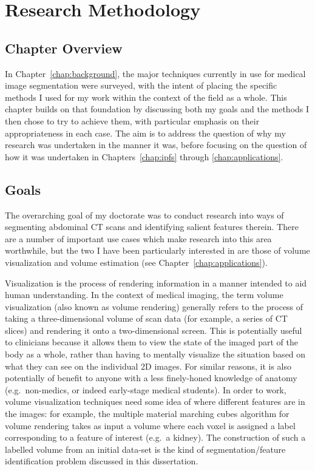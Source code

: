 \chapter{Research Methodology}
\label{chap:methodology}

\section{Chapter Overview}

In Chapter~\ref{chap:background}, the major techniques currently in use for medical image segmentation were surveyed, with the intent of placing the specific methods I used for my work within the context of the field as a whole. This chapter builds on that foundation by discussing both my goals and the methods I then chose to try to achieve them, with particular emphasis on their appropriateness in each case. The aim is to address the question of why my research was undertaken in the manner it was, before focusing on the question of how it was undertaken in Chapters~\ref{chap:ipfs} through \ref{chap:applications}.

\section{Goals}

The overarching goal of my doctorate was to conduct research into ways of segmenting abdominal CT scans and identifying salient features therein. There are a number of important use cases which make research into this area worthwhile, but the two I have been particularly interested in are those of volume visualization and volume estimation (see Chapter~\ref{chap:applications}).

Visualization is the process of rendering information in a manner intended to aid human understanding. In the context of medical imaging, the term volume visualization (also known as volume rendering) generally refers to the process of taking a three-dimensional volume of scan data (for example, a series of CT slices) and rendering it onto a two-dimensional screen. This is potentially useful to clinicians because it allows them to view the state of the imaged part of the body as a whole, rather than having to mentally visualize the situation based on what they can see on the individual 2D images. For similar reasons, it is also potentially of benefit to anyone with a less finely-honed knowledge of anatomy (e.g.~non-medics, or indeed early-stage medical students). In order to work, volume visualization techniques need some idea of where different features are in the images: for example, the multiple material marching cubes algorithm \cite{wu03} for volume rendering takes as input a volume where each voxel is assigned a label corresponding to a feature of interest (e.g.~a kidney). The construction of such a labelled volume from an initial data-set is the kind of segmentation/feature identification problem discussed in this dissertation.

